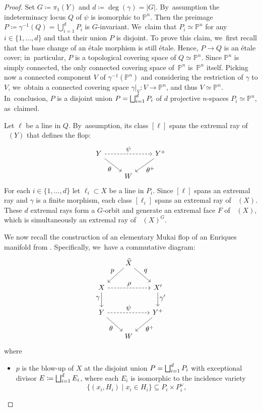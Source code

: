 \documentclass[10pt]{amsart}
\let\oldbigsqcup\bigsqcup
\renewcommand{\bigsqcup}{\mathop{\textstyle\oldbigsqcup}\displaylimits}
\let\ts\textstyle
\theoremstyle{plain}
\theoremstyle{definition}
\renewcommand{\P}{\mathbb{P}}
\DeclareMathOperator{\NEb}{\overline{\mathrm{NE}}}
\begin{document}
\begin{proof}
Set $G \coloneqq \pi_1(Y)$ and $d \coloneqq \deg(\gamma) = |G|$. By~assumption the indeterminacy locus $Q$ of $\psi$ is isomorphic to $\mathbb{P}^n$. Then the preimage $P \coloneqq \gamma^{-1} (Q) = \bigcup_{i=1}^d P_i$ is $G$\nobreakdash-invariant. We~claim that $P_i \simeq \P^n$ for any $i \in \{ 1, \dots, d \}$ and that their union $P$ is disjoint. To prove this claim, we~first recall that the base change of an étale morphism is still étale. Hence, $P \to Q$ is an étale cover; in~particular, $P$ is a topological covering space of $Q\simeq \P^n$. Since $\P^n$ is simply connected, the only connected covering space of~$\P^n$ is~$\P^n$ itself. Picking now a connected component $V$ of $\gamma^{-1}(\P^n)$ and considering the restriction of $\gamma$ to $V$, we~obtain a connected covering space $\gamma|_V \colon V \to \P^n$, and thus $V \simeq \P^n$. In~conclusion, $P$ is a disjoint union $P = \bigsqcup_{i=1}^d P_i$ of $d$ projective $n$-spaces $P_i \simeq \P^n$, as~claimed.

Let $\ell$ be a line in $Q$. By~assumption, its class $[\ell]$ spans the extremal ray of $\NEb(Y)$ that defines the flop:\vspace*{-3pt}
\[
\begin{tikzcd}
Y \arrow[rd, "\ts \theta"'] \arrow[rr, "\ts \psi", dashed] & & Y^+ \arrow[ld, "\ts \theta^+"] \\
& W
\end{tikzcd}
\]
For each $i\in \{1,\dots,d\}$ let $\ell_i \subset X$ be a line in $P_i$. Since $[\ell]$ spans an extremal ray and $\gamma$ is a finite morphism, each class $[\ell_i]$ spans an extremal ray of $\NEb(X)$. These $d$ extremal rays form a $G$\nobreakdash-orbit and generate an extremal face $F$ of $\NEb(X)$, which is simultaneously an extremal ray of $\NEb(X)^G$.

We now recall the construction of an elementary Mukai flop of an Enriques manifold from \cite[\S 4, pp.\,1645-1646]{OS11b}. Specifically, we~have a commutative diagram:\vspace*{-3pt}
\[
\begin{tikzcd}[row sep = 2em, column sep = 2em]
& \widehat{X} \ar[ld,swap,"\ts p"] \ar[rd,"\ts q"] \\
X \arrow[d, "\ts \gamma" swap, pos=0.4] \arrow[rr, dashed, "\ts \rho"] & & X' \arrow[d, "\ts \gamma'" pos=0.4] \\
Y \arrow[rd, "\ts \theta" swap] \arrow[rr, dashed, "\ts \psi"] & & Y^+ \arrow[ld, "\ts \theta^+"] \\
& W
\end{tikzcd}
\]
where
\begin{itemize}
\item
$p$ is the blow-up of $X$ at the disjoint union $P = \bigsqcup_{i=1}^d P_i$ with exceptional divisor $E \coloneqq \bigsqcup_{i=1}^d E_i$, where each $E_i$ is isomorphic to the incidence variety
\[
\bigl\{ (x_i,H_i)\mid x_i\in H_i \bigr\} \subseteq P_i\times P_i^\vee,
\]


\end{itemize}
\end{proof}
\end{document}
